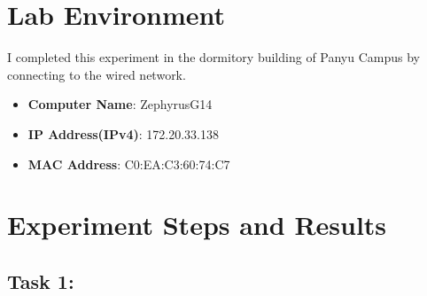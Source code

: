 \documentclass{ExpReport}
\begin{document}

\section{Lab Environment}

I completed this experiment in the dormitory building of Panyu Campus by connecting to the wired network. 



\begin{itemize}
    \item \textbf{Computer Name}: ZephyrusG14
    \item \textbf{IP Address(IPv4)}: 172.20.33.138
    \item \textbf{MAC Address}: C0:EA:C3:60:74:C7
\end{itemize}


\section{Experiment Steps and Results}


\subsection{Task 1: }
\end{document}
